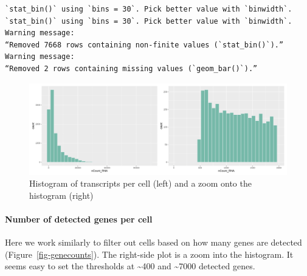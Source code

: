\documentclass[
  letterpaper,
  DIV=11,
  numbers=noendperiod]{scrartcl}
\let\oldparagraph\paragraph
\renewcommand{\paragraph}[1]{\oldparagraph{#1}\mbox{}}
\begin{document}
\begin{verbatim}
`stat_bin()` using `bins = 30`. Pick better value with `binwidth`.
`stat_bin()` using `bins = 30`. Pick better value with `binwidth`.
Warning message:
“Removed 7668 rows containing non-finite values (`stat_bin()`).”
Warning message:
“Removed 2 rows containing missing values (`geom_bar()`).”
\end{verbatim}

\begin{figure}[H]

{\centering \includegraphics{notebook_files/figure-pdf/fig-rnacount-output-2.png}

}

\caption{\label{fig-rnacount}Histogram of transcripts per cell (left)
and a zoom onto the histogram (right)}

\end{figure}

\hypertarget{number-of-detected-genes-per-cell}{%
\paragraph{Number of detected genes per
cell}\label{number-of-detected-genes-per-cell}}

Here we work similarly to filter out cells based on how many genes are
detected (Figure~\ref{fig-genecounts}). The right-side plot is a zoom
into the histogram. It seems easy to set the thresholds at
\textasciitilde400 and \textasciitilde7000 detected genes.
\end{document}
